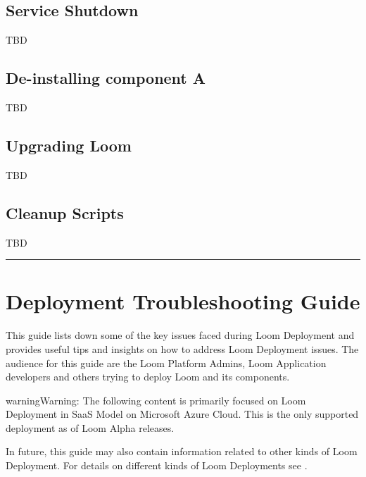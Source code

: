 \documentclass[letterpaper,10pt,english]{sphinxmanual}
\begin{document}
\section{Service Shutdown}
\label{\detokenize{loom_installation_guide:service-shutdown}}
TBD


\section{De-installing component A}
\label{\detokenize{loom_installation_guide:de-installing-component-a}}
TBD


\section{Upgrading Loom}
\label{\detokenize{loom_installation_guide:upgrading-loom}}
TBD


\section{Cleanup Scripts}
\label{\detokenize{loom_installation_guide:cleanup-scripts}}
TBD


\bigskip\hrule\bigskip



\chapter{Deployment Troubleshooting Guide}
\label{\detokenize{loom_installation_guide:ing-com-dep-trbs}}\label{\detokenize{loom_installation_guide:deployment-troubleshooting-guide}}
This guide lists down some of the key issues faced during Loom Deployment and provides useful tips and insights on how to address Loom Deployment issues.  The audience for this guide are the Loom Platform Admins, Loom Application developers and others trying to deploy Loom and its components.

\begin{sphinxadmonition}{warning}{Warning:}
The following content is primarily focused on Loom Deployment in SaaS Model on Microsoft Azure Cloud. This is the only supported deployment as of Loom Alpha releases.

In future, this guide may also contain information related to other kinds of Loom Deployment.  For details on different kinds of Loom Deployments see {\hyperref[\detokenize{loom_installation_guide:ing-dep-models-mcdmp-rst}]{}}.
\end{sphinxadmonition}
\end{document}
